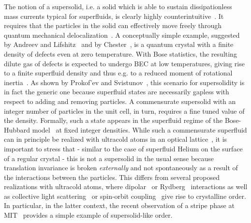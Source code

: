 \documentclass[12pt]{iopart}
\begin{document}
The notion of a supersolid, i.e. a solid which is able to sustain dissipationless mass currents 
typical for superfluids, is clearly highly counterintuitive~\cite{boninsegni2012}. It requires that
the particles in the solid can effectively move freely through quantum mechanical delocalization~\cite{yang62}.
A conceptually simple example, suggested by Andreev and Lifshitz~\cite{andreev1969} and by Chester~\cite{chester1970},
is a quantum crystal with a finite density of defects even at zero temperature. With Bose statistics, the resulting
dilute gas of defects is expected to undergo BEC at low temperatures, giving rise to a finite superfluid density 
and thus e.g. to a reduced moment of rotational inertia~\cite{leggett1970}. As shown by Prokof'ev and 
Svistunov~\cite{prokofev2005}, this scenario for supersolidity is in fact the generic one because superfluid 
states are necessarily gapless with respect to adding and removing particles. A commensurate supersolid with 
an integer number of particles in the unit cell, in turn, requires a fine tuned value of the density. Formally, 
such a state appears in the superfluid regime of the Bose-Hubbard model~\cite{fisher1989} at 
fixed integer densities. While such a commensurate superfluid can in principle be realized with ultracold atoms 
in an optical lattice~\cite{greiner2002},  it is important to stress that - similar to the case of superfluid Helium on the surface of a 
regular crystal - this is not a supersolid in the usual sense because translation invariance is broken 
{\it externally} and not spontaneously as a result of the interactions between the particles. This differs 
from several proposed realizations with ultracold atoms, where dipolar~\cite{giovannazzi_dipolar_2002} or Rydberg~\cite{henkel_rydberg_2010} 
interactions as well as collective light scattering~\cite{ostermann_CARL_2016} or
spin-orbit coupling~\cite{martone_SOC_2013} give rise to crystalline order. In particular, in the latter context, the recent 
observation of a stripe phase at MIT~\cite{MIT_stripeSS_2017} provides a simple example of supersolid-like order. \\ 
\end{document}
